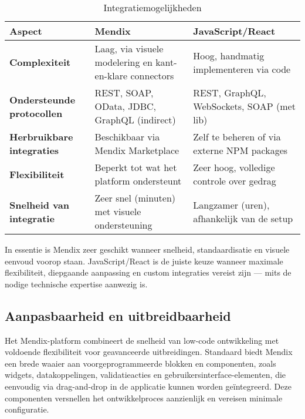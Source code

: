\begin{table}[H]
    \centering
    \begin{tabular}{ |p{3cm}|p{5.5cm}|p{5.5cm}|}
        \hline
        \textbf{Aspect} & \textbf{Mendix} & \textbf{JavaScript/React}\\
        \hline
        \textbf{Complexiteit}  & Laag, via visuele modelering en kant-en-klare connectors & Hoog, handmatig implementeren via code  \\
        \hline
        \textbf{Ondersteunde protocollen} & REST, SOAP, OData, JDBC, GraphQL (indirect) & REST, GraphQL, WebSockets, SOAP (met lib) \\
        \hline
        \textbf{Herbruikbare integraties}  & Beschikbaar via Mendix Marketplace & 	Zelf te beheren of via externe NPM packages \\
        \hline
        \textbf{Flexibiliteit}  & 	Beperkt tot wat het platform ondersteunt & Zeer hoog, volledige controle over gedrag \\
        \hline                       
        \textbf{Snelheid van integratie}  & 	Zeer snel (minuten) met visuele ondersteuning & Langzamer (uren), afhankelijk van de setup \\
        \hline
    \end{tabular}
    \caption[\centering Integratiemogelijkheden]{\label{tab:integratiemogelijkheden}Integratiemogelijkheden}
\end{table}
In essentie is Mendix zeer geschikt wanneer snelheid, standaardisatie en visuele eenvoud voorop staan. JavaScript/React is de juiste keuze wanneer maximale flexibiliteit, diepgaande aanpassing en custom integraties vereist zijn — mits de nodige technische expertise aanwezig is.


\subsection{Aanpasbaarheid en uitbreidbaarheid}

Het Mendix-platform combineert de snelheid van low-code ontwikkeling met voldoende flexibiliteit voor geavanceerde uitbreidingen. Standaard biedt Mendix een brede waaier aan voorgeprogrammeerde blokken en componenten, zoals widgets, datakoppelingen, validatieacties en gebruikersinterface-elementen, die eenvoudig via drag-and-drop in de applicatie kunnen worden geïntegreerd. Deze componenten versnellen het ontwikkelproces aanzienlijk en vereisen minimale configuratie.

